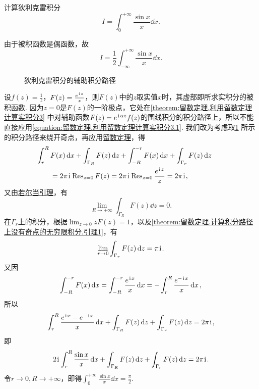 \begin{example}
计算狄利克雷积分\[
I = \int_0^{+\infty} \frac{\sin x}{x} \dd{x}.
\]
\begin{solution}
由于被积函数是偶函数，故\[
I = \frac{1}{2} \int_{-\infty}^{+\infty} \frac{\sin x}{x} \dd{x}.
\]

\begin{figure}[ht]
\centering
{}
\caption{狄利克雷积分的辅助积分路径}
\label{figure:留数定理.狄利克雷积分的辅助积分路径}
\end{figure}

设\(f(z) = \frac{1}{z}\)，\(F(z) = \frac{e^{\kern1pt\mathrm{i}\kern1pt z}}{z}\)，则\(F(z)\)中的\(z\)取实值\(x\)时，其虚部即所求实积分的被积函数.
因为\(z=0\)是\(F(z)\)的一阶极点，它处在\cref{theorem:留数定理.利用留数定理计算实积分3} 中对辅助函数\(F(z) = e^{\kern1pt\mathrm{i}\kern1pt\alpha z} f(z)\)的围线积分的积分路径上，所以不能直接应用\cref{equation:留数定理.利用留数定理计算实积分3.1}.
我们改为考虑取\cref{figure:留数定理.狄利克雷积分的辅助积分路径} 所示的积分路径来绕开奇点，再应用\hyperref[theorem:留数定理.柯西留数定理]{留数定理}，得\[
\begin{split}
&\hspace{-20pt}\int_r^R F(x) \dd{x}
+ \int_{\Gamma_R} F(z) \dd{z}
+ \int_{-R}^{-r} F(x) \dd{x}
+ \int_{\Gamma_r} F(z) \dd{z} \\
&= 2\pi\iu \Res_{z=0} F(z)
= 2\pi\iu \Res_{z=0} \frac{e^{\iu z}}{z}
= 2\pi\iu,
\end{split}
\]又由\hyperref[theorem:留数定理.计算积分路径上没有奇点的无穷限积分.引理2]{若尔当引理}，有\[
\lim_{R\to+\infty} \int_{\Gamma_R} F(z) \dd{z} = 0.
\]在\(\Gamma_r\)上的积分，根据\(\lim_{z\to0} z F(z) = 1\)，以及\cref{theorem:留数定理.计算积分路径上没有奇点的无穷限积分.引理1}，有\[
\lim_{r\to0} \int_{\Gamma_r} F(z) \dd{z} = \pi\kern1pt\mathrm{i}\kern1pt.
\]又因\[
\int_{-R}^{-r} F(x) \dd{x}
= \int_{-R}^{-r} \frac{e^{\kern1pt\mathrm{i}\kern1pt x}}{x} \dd{x}
= -\int_r^R \frac{e^{-\kern1pt\mathrm{i}\kern1pt x}}{x} \dd{x},
\]所以\[
\int_r^R \frac{e^{\kern1pt\mathrm{i}\kern1pt x} - e^{-\kern1pt\mathrm{i}\kern1pt x}}{x} \dd{x}
+ \int_{\Gamma_R} F(z) \dd{z}
+ \int_{\Gamma_r} F(z) \dd{z}
= 2\pi\kern1pt\mathrm{i}\kern1pt,
\]即\[
2\kern1pt\mathrm{i}\kern1pt \int_r^R \frac{\sin x}{x} \dd{x}
+ \int_{\Gamma_R} F(z) \dd{z}
+ \int_{\Gamma_r} F(z) \dd{z}
= 2\pi\kern1pt\mathrm{i}\kern1pt.
\]令\(r\to0, R\to+\infty\)，即得\(\int_0^{+\infty} \frac{\sin x}{x} \dd{x} = \frac{\pi}{2}\).
\end{solution}
\end{example}

